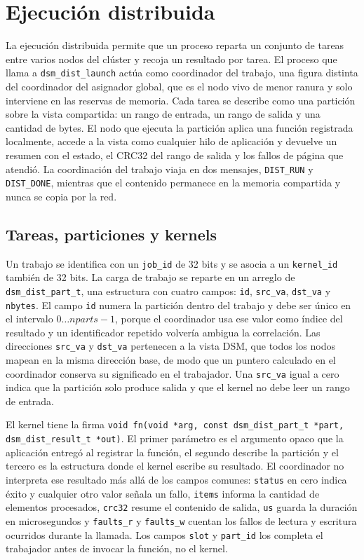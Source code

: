 \section{Ejecución distribuida}\label{sec:distribuida}

La ejecución distribuida permite que un proceso reparta un conjunto de tareas entre varios nodos del clúster y recoja un resultado por tarea. El proceso que llama a \texttt{dsm\_dist\_launch} actúa como coordinador del trabajo, una figura distinta del coordinador del asignador global, que es el nodo vivo de menor ranura y solo interviene en las reservas de memoria. Cada tarea se describe como una partición sobre la vista compartida: un rango de entrada, un rango de salida y una cantidad de bytes. El nodo que ejecuta la partición aplica una función registrada localmente, accede a la vista como cualquier hilo de aplicación y devuelve un resumen con el estado, el CRC32 del rango de salida y los fallos de página que atendió. La coordinación del trabajo viaja en dos mensajes, \texttt{DIST\_RUN} y \texttt{DIST\_DONE}, mientras que el contenido permanece en la memoria compartida y nunca se copia por la red.

\subsection{Tareas, particiones y kernels}

Un trabajo se identifica con un \texttt{job\_id} de 32 bits y se asocia a un \texttt{kernel\_id} también de 32 bits. La carga de trabajo se reparte en un arreglo de \texttt{dsm\_dist\_part\_t}, una estructura con cuatro campos: \texttt{id}, \texttt{src\_va}, \texttt{dst\_va} y \texttt{nbytes}. El campo \texttt{id} numera la partición dentro del trabajo y debe ser único en el intervalo $0 \ldots nparts-1$, porque el coordinador usa ese valor como índice del resultado y un identificador repetido volvería ambigua la correlación. Las direcciones \texttt{src\_va} y \texttt{dst\_va} pertenecen a la vista DSM, que todos los nodos mapean en la misma dirección base, de modo que un puntero calculado en el coordinador conserva su significado en el trabajador. Una \texttt{src\_va} igual a cero indica que la partición solo produce salida y que el kernel no debe leer un rango de entrada.

El kernel tiene la firma \texttt{void fn(void *arg, const dsm\_dist\_part\_t *part, dsm\_dist\_result\_t *out)}. El primer parámetro es el argumento opaco que la aplicación entregó al registrar la función, el segundo describe la partición y el tercero es la estructura donde el kernel escribe su resultado. El coordinador no interpreta ese resultado más allá de los campos comunes: \texttt{status} en cero indica éxito y cualquier otro valor señala un fallo, \texttt{items} informa la cantidad de elementos procesados, \texttt{crc32} resume el contenido de salida, \texttt{us} guarda la duración en microsegundos y \texttt{faults\_r} y \texttt{faults\_w} cuentan los fallos de lectura y escritura ocurridos durante la llamada. Los campos \texttt{slot} y \texttt{part\_id} los completa el trabajador antes de invocar la función, no el kernel.

